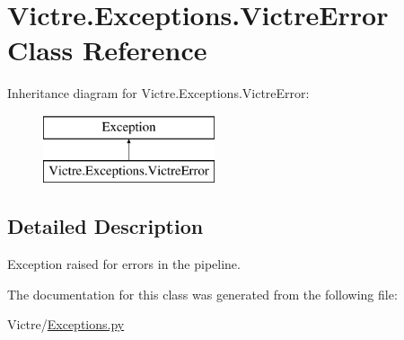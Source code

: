 \hypertarget{classVictre_1_1Exceptions_1_1VictreError}{\section{Victre.\-Exceptions.\-Victre\-Error Class Reference}
\label{classVictre_1_1Exceptions_1_1VictreError}
}
Inheritance diagram for Victre.\-Exceptions.\-Victre\-Error\-:\begin{figure}[H]
\begin{center}
\leavevmode
\includegraphics[height=2.000000cm]{classVictre_1_1Exceptions_1_1VictreError}
\end{center}
\end{figure}


\subsection{Detailed Description}
\begin{DoxyVerb}Exception raised for errors in the pipeline.\end{DoxyVerb}
 

The documentation for this class was generated from the following file\-:\begin{DoxyCompactItemize}
\item 
Victre/\hyperlink{Exceptions_8py}{Exceptions.\-py}\end{DoxyCompactItemize}
